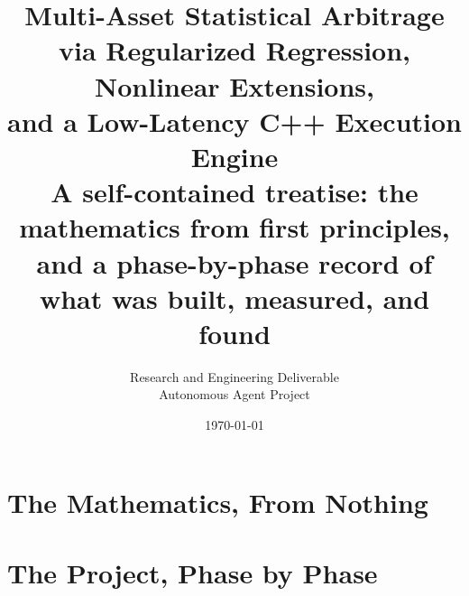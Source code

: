 \documentclass[11pt]{article}
\title{\bfseries Multi-Asset Statistical Arbitrage\\[4pt]
       \large via Regularized Regression, Nonlinear Extensions,\\
       and a Low-Latency C++ Execution Engine\\[10pt]
       \normalsize A self-contained treatise: the mathematics from first principles,\\
       and a phase-by-phase record of what was built, measured, and found}
\author{Research and Engineering Deliverable\\[2pt] \small Autonomous Agent Project}
\date{\today}
\theoremstyle{remark}
\begin{document}
\maketitle



\tableofcontents
\newpage

\part{The Mathematics, From Nothing}
\label{part:theory}













\part{The Project, Phase by Phase}
\label{part:phases}
















\end{document}
